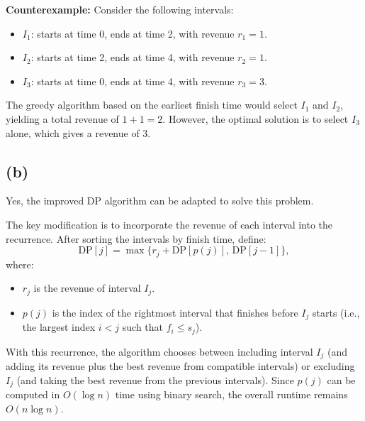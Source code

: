 \documentclass[11pt]{article}
\begin{document}
    \medskip
    \noindent\textbf{Counterexample:} Consider the following intervals:
    \begin{itemize}
        \item \( I_1 \): starts at time 0, ends at time 2, with revenue \( r_1 = 1 \).
        \item \( I_2 \): starts at time 2, ends at time 4, with revenue \( r_2 = 1 \).
        \item \( I_3 \): starts at time 0, ends at time 4, with revenue \( r_3 = 3 \).
    \end{itemize}
    The greedy algorithm based on the earliest finish time would select \( I_1 \) and \( I_2 \), yielding a total revenue of \( 1 + 1 = 2.\)
    However, the optimal solution is to select \( I_3 \) alone, which gives a revenue of 3.
    
    \subsection*{(b)}
    Yes, the improved DP algorithm can be adapted to solve this problem.
    
    \medskip
    \noindent The key modification is to incorporate the revenue of each interval into the recurrence. After sorting the intervals by finish time, define:
    \[
    \text{DP}[j] = \max\{r_j + \text{DP}[p(j)],\, \text{DP}[j-1]\},
    \]
    where:
    \begin{itemize}
        \item \( r_j \) is the revenue of interval \( I_j \).
        \item \( p(j) \) is the index of the rightmost interval that finishes before \( I_j \) starts (i.e., the largest index \( i < j \) such that \( f_i \le s_j \)).
    \end{itemize}
    
    \medskip
    \noindent With this recurrence, the algorithm chooses between including interval \( I_j \) (and adding its revenue plus the best revenue from compatible intervals) or excluding \( I_j \) (and taking the best revenue from the previous intervals). Since \( p(j) \) can be computed in \( O(\log n) \) time using binary search, the overall runtime remains \( O(n \log n) \).
    


    \newpage
\end{document}
